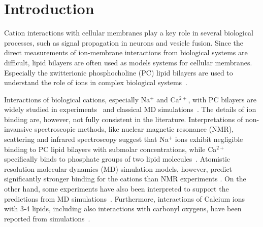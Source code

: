 \documentclass[aip,jcp,twocolumn]{revtex4}
\begin{document}
\section{Introduction}
Cation interactions with cellular membranes play a key role in several biological processes,
such as signal propagation in neurons and vesicle fusion.
Since the direct measurements of ion-membrane interactions from biological systems
are difficult, lipid bilayers are often used as models systems for cellular
membranes. Especially the zwitterionic phosphocholine (PC) lipid bilayers are
used to understand the role of ions in complex biological
systems~\cite{scherer87,seelig90,cevc90}.

Interactions of biological cations, especially Na$^+$ and
Ca$^{2+}$, with PC bilayers are widely studied in
experiments~\cite{akutsu81,altenbach84,seelig90,cevc90,tocanne90,binder02,pabst07,uhrikova08}
and classical MD simulations~\cite{bockmann03,bockmann04,Berkowitz12,melcrova16,javanainen17}.
The details of ion binding are, however, not fully consistent in the literature.
Interpretations of non-invansive spectroscopic methods, like nuclear magnetic resonance (NMR), scattering
and infrared spectroscopy suggest that Na$^+$ ions exhibit
negligible binding to PC lipid bilayers with submolar concentrations, while Ca$^{2+}$ specifically
binds to phosphate groups of two lipid molecules~\cite{hauser76,hauser78,herbette84,akutsu81,altenbach84,binder02,pabst07,uhrikova08}.
Atomistic resolution molecular dynamics (MD) simulation models, however, predict significantly
stronger binding for the cations than NMR experiments \cite{catte16}.
On the other hand, some experiments have also been interpreted to support the predictions from
MD simulations~\cite{bockmann03,vacha09a}. 
Furthermore, interactions of Calcium ions with 3-4 lipids,
including also interactions with carbonyl
oxygens, have been reported from simulations~\cite{bockmann03,bockmann04,melcrova16,javanainen17}.
\end{document}
